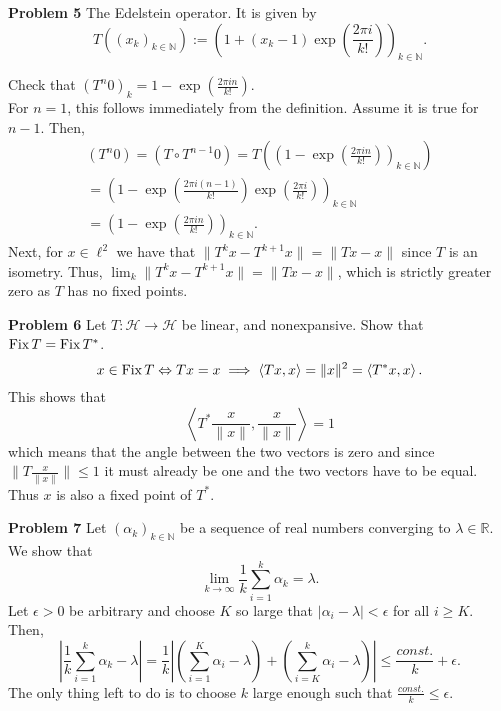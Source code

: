\documentclass{scrartcl}
\newcommand{\N}{\mathbb{N}}
\newcommand{\R}{\mathbb{R}}
\renewcommand{\H}{\mathcal{H}}
\theoremstyle{plain}
\theoremstyle{remark}
\newcommand{\Fix}{\textup{Fix}\,}
\begin{document}
\textbf{Problem 5} The Edelstein operator.
It is given by 
\begin{equation}
  T\left({(x_{k})}_{k \in \N}\right) := {\left( 1 + (x_{k} - 1)\exp \left(\frac{2 \pi i}{k!}\right)\right)}_{k \in \N}.
\end{equation}

Check that ${(T^{n}0)}_{k} = 1 - \exp \left(\frac{2 \pi i n}{k!}\right)$.\\

For $n=1$, this follows immediately from the definition.
Assume it is true for $n-1$. Then,
\begin{equation}
  \begin{aligned}
    {(T^{n}0)} = {(T \circ T^{n-1}0)} = T \left( {\left(1 - \exp \left(\frac{2 \pi i n}{k!}\right)\right)}_{k \in \N} \right) \\
    = {\left( 1 - \exp\left(\frac{2 \pi i (n-1)}{k!}\right)\exp \left(\frac{2 \pi i}{k!}\right)\right)}_{k \in \N} \\
    = {\left( 1 - \exp \left(\frac{2 \pi i n }{k!}\right)\right)}_{k \in \N}.
  \end{aligned}
\end{equation}
Next, for $x \in \ell^2$ we have that $\lVert T^{k}x - T^{k+1}x \rVert = \lVert Tx - x \rVert$ since $T$ is an isometry.
Thus, $\lim_{k} \lVert T^{k}x - T^{k+1}x \rVert = \lVert Tx - x \rVert$, which is strictly greater zero as $T$ has no fixed points.


\textbf{Problem 6} Let $T: \H \to \H$ be linear, and nonexpansive. Show that $\Fix T = \Fix T^*$.
\begin{equation}
  x \in \Fix T \Leftrightarrow Tx=x \implies \left\langle Tx, x \right\rangle = \lVert x \rVert^2 = \left\langle T^*x, x \right\rangle.
\end{equation}
This shows that 
\begin{equation}
  \left\langle T^*\frac{x}{\lVert x \rVert}, \frac{x}{\lVert x \rVert} \right\rangle = 1
\end{equation}
which means that the angle between the two vectors is zero and since $\lVert T \frac{x}{\lVert x \rVert} \rVert \le 1$ it must already be one and the two vectors have to be equal. Thus $x$ is also a fixed point of $T^*$.

\textbf{Problem 7} Let ${(\alpha_{k})}_{k \in \N}$ be a sequence of real numbers converging to $\lambda \in \R$. We show that
\begin{equation}
  \lim_{k \to \infty} \frac{1}{k} \sum_{i=1}^{k} \alpha_{k} = \lambda.
\end{equation}
Let $\epsilon>0$ be arbitrary and choose $K$ so large that $\lvert \alpha_{i} - \lambda \rvert < \epsilon$ for all $i\ge K$. Then,
\begin{equation}
  \left\lvert \frac{1}{k} \sum_{i=1}^{k} \alpha_{k} - \lambda \right\rvert = \frac{1}{k} \left\lvert \left(\sum_{i=1}^{K} \alpha_{i} - \lambda\right) + \left( \sum_{i=K}^{k} \alpha_{i} - \lambda \right) \right\rvert \le \frac{const.}{k} + \epsilon.
\end{equation}
The only thing left to do is to choose $k$ large enough such that $\frac{const.}{k} \le \epsilon$.
\end{document}
